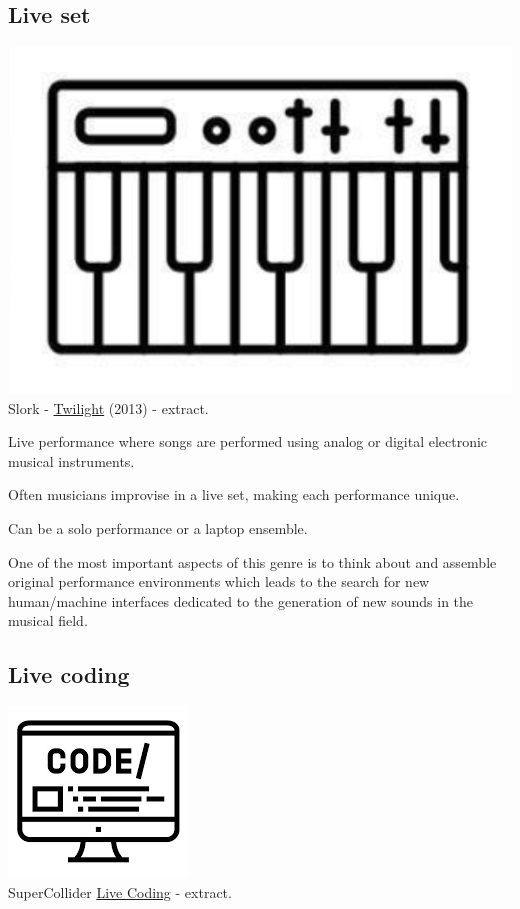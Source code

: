 \subsection{Live set }\label{live-set}

\begin{center}
\includegraphics[scale=0.3]{../img/lset.png}\\
Slork - \href{http://www.musicaecodice.it/gitmedia/emc/2_media/slork1.mp4}{Twilight} (2013) - extract.
\end{center}

Live performance where songs are performed using analog or digital electronic musical instruments.

Often musicians improvise in a live set, making each performance unique.

Can be a solo performance or a laptop ensemble.

One of the most important aspects of this genre is to think about and assemble original performance environments which leads to the search for new human/machine interfaces dedicated to the generation of new sounds in the musical field.

\subsection{Live coding}\label{live-coding}

\begin{center}
\includegraphics[scale=0.4]{../img/lcod.png}\\
SuperCollider \href{http://www.musicaecodice.it/gitmedia/emc/2_media/livec1.mp4}{Live Coding} - extract.
\end{center}

